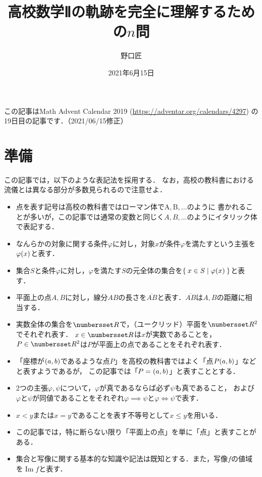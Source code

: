 \documentclass[11pt,a4paper]{ltjsarticle}
\title{高校数学Ⅱの軌跡を完全に理解するための$n$問}
\author{野口匠}
\date{2021年6月15日}
\newcommand*{\length}[1]{\overline{#1}}
\newcommand*{\equivalent}{\Longleftrightarrow}
\newcommand*{\coord}[1]{\paren{#1}}
\DeclareMathOperator{\Image}{Im}
\theoremstyle{definition}
\begin{document}
%
\maketitle

この記事はMath Advent Calendar 2019 (\url{https://adventar.org/calendars/4297}) の19日目の記事です．（2021/06/15修正）

\section{準備} \label{sec:pre}

この記事では，以下のような表記法を採用する．
なお，高校の教科書における流儀とは異なる部分が多数見られるので注意せよ．

\begin{itemize}
	\item 点を表す記号は高校の教科書ではローマン体で$\mathrm{A}, \mathrm{B}, \dotsc$のように
	      書かれることが多いが，この記事では通常の変数と同じく$A,B, \dotsc$のようにイタリック体で表記する．
	\item なんらかの対象に関する条件$\varphi$に対し，対象$x$が条件$\varphi$を満たすという主張を$\apply{\varphi}{x}$と表す．
	\item 集合$S$と条件$\varphi$に対し，$\varphi$を満たす$S$の元全体の集合を$\setintension{x \in S}{\apply{\varphi}{x}}$と表す．
	\item 平面上の点$A,B$に対し，線分$AB$の長さを$\length{AB}$と表す．$\length{AB}$は$A,B$の距離に相当する．
	\item 実数全体の集合を$\Real$で，（ユークリッド）平面を$\Real ^2$でそれぞれ表す．
	      $x \in \Real$は$x$が実数であることを，$P \in \Real ^2$は$P$が平面上の点であることをそれぞれ表す．
	\item 「座標が$\coord{a,b}$であるような点$P$」を高校の教科書ではよく「点$P{\coord{a,b}}$」などと表すようであるが，
	      この記事では「$P = \coord{a,b}$」と表すこととする．
	\item 2つの主張$\varphi, \psi$について，$\varphi$が真であるならば必ず$\psi$も真であること，
	      および$\varphi$と$\psi$が同値であることをそれぞれ$\varphi \implies \psi$と$\varphi \equivalent \psi$で表す．
	\item $x < y$または$x = y$であることを表す不等号として$x \leq y$を用いる．
	\item この記事では，特に断らない限り「平面上の点」を単に「点」と表すことがある．
	\item 集合と写像に関する基本的な知識や記法は既知とする．また，写像$f$の値域を$\Image f$と表す．
\end{itemize}
\end{document}
